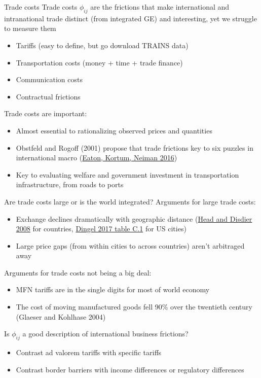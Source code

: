 \documentclass[10pt,notes=hide]{beamer}
\begin{document}
\begin{frame}{Trade costs}
Trade costs $\phi_{ij}$ are the frictions that make international and intranational trade distinct (from integrated GE) and interesting, yet we struggle to measure them
\begin{itemize}
	\item Tariffs (easy to define, but go download TRAINS data)
	\item Transportation costs (money + time + trade finance)
	\item Communication costs
	\item Contractual frictions
\end{itemize}
Trade costs are important:
\begin{itemize}
	\item Almost essential to rationalizing observed prices and quantities
	\item Obstfeld and Rogoff (2001) propose that trade frictions key to six puzzles in international macro (\href{https://www.sciencedirect.com/science/article/pii/S0165188916301014}{Eaton, Kortum, Neiman 2016})
	\item Key to evaluating welfare and government investment in transportation infrastructure, from roads to ports
\end{itemize}
\end{frame}
\begin{frame}{Are trade costs large or is the world integrated?}
Arguments for large trade costs:
\begin{itemize}
	\item Exchange declines dramatically with geographic distance ({\small \href{https://www.mitpressjournals.org/doi/10.1162/rest.90.1.37}{Head and Disdier 2008} for countries, \href{http://faculty.chicagobooth.edu/jonathan.dingel/research/thedeterminantsofqualityspecialization.pdf}{Dingel 2017 table C.1} for US cities})
	\item Large price gaps (from within cities to across countries) aren't arbitraged away
\end{itemize}
Arguments for trade costs not being a big deal:
\begin{itemize}
	\item MFN tariffs are in the single digits for most of world economy
	\item The cost of moving manufactured goods fell 90\% over the twentieth century (Glaeser and Kohlhase 2004)
\end{itemize}
Is $\phi_{ij}$ a good description of international business frictions?
\begin{itemize}
	\item Contrast ad valorem tariffs with specific tariffs
	\item Contrast border barriers with income differences or regulatory differences
\end{itemize}
\end{frame}
\end{document}
